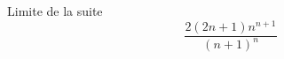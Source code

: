 Limite de la suite
\begin{displaymath}
 \frac{2(2n+1)n^{n+1}}{(n+1)^n}
\end{displaymath}

\bigskip \bigskip
